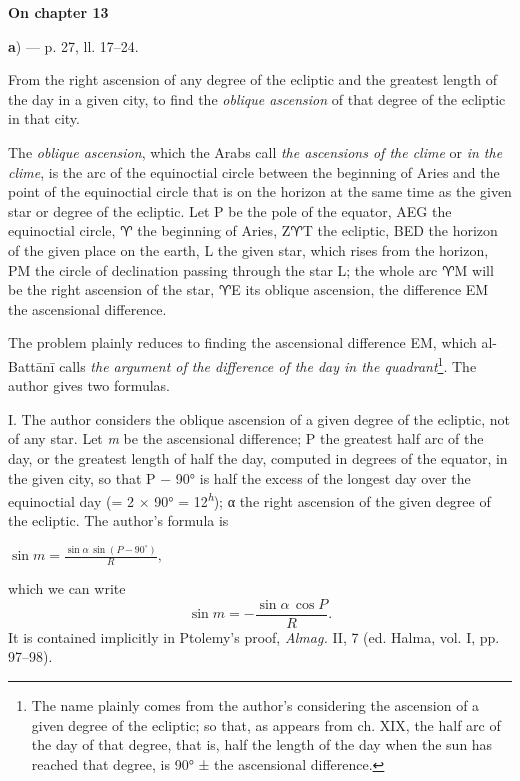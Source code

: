 \documentclass[11pt]{article}
\newcommand{\Pg}[1]{\marginpar{\footnotesize\color{gray}#1}}
\newcommand{\UnitHead}[2]{\par\setcounter{footnoteT}{0}\needspace{8\baselineskip}\bigskip\pdfbookmark[1]{#1}{unit-#2}\hypertarget{EN-#2}{}%
 {\large\bfseries\interlinepenalty=10000 #1\par}\nobreak\medskip}
\begin{document}
\UnitHead{On chapter 13}{A13}
\par\begin{center}\textbf{a}) — p. 27, ll. 17–24.\end{center}
\par From the right ascension of any degree of the ecliptic and the greatest length of the day in a given city, to find the \emph{oblique ascension} of that degree of the ecliptic in that city.\par
\begin{center}\end{center}
\par The \emph{oblique ascension}, which the Arabs call \emph{the ascensions of the clime} or \emph{in the clime}, is the arc of the equinoctial circle between the beginning of Aries and the point of the equinoctial circle that is on the horizon at the same time as the given star or degree of the ecliptic. Let P be the pole of the equator, AEG the equinoctial circle, {\MoonFont\upshape ♈} the beginning of Aries, Z{\MoonFont\upshape ♈}T the ecliptic, BED the horizon of the given place on the earth, L the given star, which rises from the horizon, PM the circle of declination passing through the star L; the whole arc {\MoonFont\upshape ♈}M will be the right ascension of the star, {\MoonFont\upshape ♈}E its oblique ascension, the difference EM the ascensional difference.\par
\par The problem plainly reduces to finding the ascensional difference EM, which al-Battānī calls \emph{the argument of the difference of the day in the quadrant}\footnote{The name plainly comes from the author's considering the ascension of a given degree of the ecliptic; so that, as appears from ch. XIX, the half arc of the day of that degree, that is, half the length of the day when the sun has reached that degree, is 90° ± the ascensional difference.}. The author gives two formulas.\par
\par \Pg{I 188}I. The author considers the oblique ascension of a given degree of the ecliptic, not of any star. Let \emph{m} be the ascensional difference; P the greatest half arc of the day, or the greatest length of half the day, computed in degrees of the equator, in the given city, so that P − 90° is half the excess of the longest day over the equinoctial day (= 2 × 90° = 12\textsuperscript{\itshape h}); {\greekfont α} the right ascension of the given degree of the ecliptic. The author's formula is \par\noindent\hspace*{1.5em}$\displaystyle \sin m = \frac{\sin\alpha\,\sin(P - 90^\circ)}{R},$\par which we can write \[ \sin m = -\frac{\sin\alpha\,\cos P}{R}. \] It is contained implicitly in Ptolemy's proof, \emph{Almag.} II, 7 (ed. Halma, vol. I, pp. 97–98).\par
\end{document}
